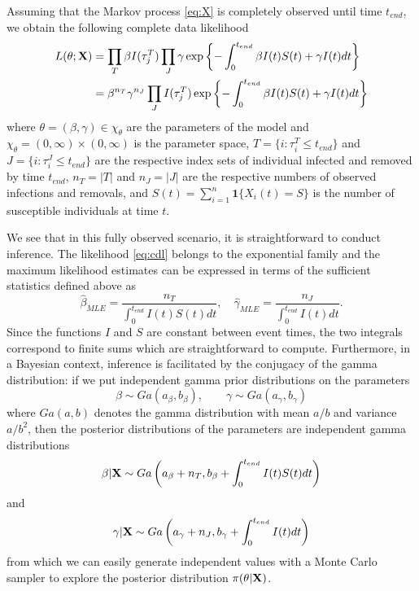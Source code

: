 \documentclass[11pt]{article}
\begin{document}
	Assuming that the Markov process \ref{eq:X} is completely observed until time $t_{end}$, we obtain the following complete data likelihood
	\begin{align}
		L(\theta; \mathbf{X})
		& = \prod_{T} \beta I(\tau^T_j) \prod_{J} \gamma \exp\left\lbrace - \int_{0}^{t_{end}}\beta I(t)S(t) + \gamma I(t) dt \right\rbrace  \nonumber \\
		\label{eq:cdl}
		& = \beta^{n_T} \gamma^{n_J}\prod_{J} I(\tau^T_j) \exp\left\lbrace - \int_{0}^{t_{end}}\beta I(t)S(t) + \gamma I(t) dt \right\rbrace
	\end{align}
	where $\theta = (\beta, \gamma) \in \chi_{\theta}$  are the parameters of the model and $\chi_{\theta} = (0, \infty) \times (0, \infty)$ is the parameter space, 
	$T = \{i:\tau^T_i \le t_{end}\}$ and $J = \{i:\tau^J_i \le t_{end}\}$ are the respective index sets of individual infected and removed by time $t_{end}$, 
	$n_T = |T|$ and $n_J = |J|$ are the respective numbers of observed infections and removals,
	and	$S(t) = \sum_{i=1}^n \mathbf{1}\{X_i(t) = S\}$ is the number of susceptible individuals at time $t$.
	
	We see that in this fully observed scenario, it is straightforward to conduct inference. The likelihood \ref{eq:cdl} belongs to the exponential family and the maximum likelihood estimates can be expressed in terms of the sufficient statistics defined above as
	$$\hat{\beta}_{MLE} = \dfrac{n_T}{ \int_{0}^{t_{end}} I(t)S(t)dt}, \quad \hat{\gamma}_{MLE} = \dfrac{n_J}{\int_{0}^{t_{end}} I(t)dt}.$$
	Since the functions $I$ and $S$ are constant between event times, the two integrals correspond to finite sums which are straightforward to compute.
	Furthermore, in a Bayesian context, inference is facilitated by the conjugacy of the gamma distribution: if we put independent gamma prior distributions on the parameters
		\begin{equation}
		\label{eq:pri}
		\beta \sim Ga(a_{\beta}, b_{\beta}), \qquad \gamma \sim Ga(a_{\gamma}, b_{\gamma})
	\end{equation}
	where $Ga(a,b)$ denotes the gamma distribution with mean $a/b$ and variance $a/b^2$, then the posterior distributions of the parameters are independent gamma distributions
	\begin{equation}
		\label{eq:pdb}
		\beta | \mathbf{X} \sim Ga\left( a_{\beta} + n_T, b_{\beta} + \int_{0}^{t_{end}} I(t)S(t) dt\right)
	\end{equation}
	and
	\begin{equation}
		\label{eq:pdg}
		\gamma | \mathbf{X} \sim Ga\left( a_{\gamma} + n_J, b_{\gamma} + \int_{0}^{t_{end}} I(t) dt\right)
	\end{equation}
	from which we can easily generate independent values with a Monte Carlo sampler to explore the posterior distribution $\pi(\theta|\mathbf{X})$.
		
\end{document}
